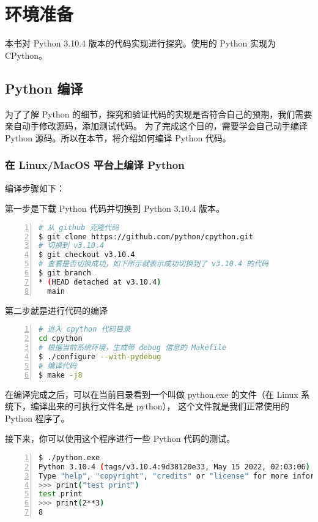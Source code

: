 \chapter{环境准备}

本书对 Python 3.10.4 版本的代码实现进行探究。使用的 Python 实现为 CPython。

\section{Python 编译}

为了了解 Python 的细节，探究和验证代码的实现是否符合自己的预期，我们需要亲自动手修改源码，添加测试代码。
为了完成这个目的，需要学会自己动手编译 Python 源码。所以在本节，将介绍如何编译 Python 代码。

\subsection{在 Linux/MacOS 平台上编译 Python}

编译步骤如下：

第一步是下载 Python 代码并切换到 Python 3.10.4 版本。

\begin{lstlisting}[language=bash, numbers=left, numbersep=1em, numberstyle=\footnotesize , breaklines=true]
# 从 github 克隆代码
$ git clone https://github.com/python/cpython.git
# 切换到 v3.10.4
$ git checkout v3.10.4
# 查看是否切换成功，如下所示就表示成功切换到了 v3.10.4 的代码
$ git branch
* (HEAD detached at v3.10.4)
  main
\end{lstlisting}

第二步就是进行代码的编译

\begin{lstlisting}[language=bash, numbers=left, numbersep=1em, numberstyle=\footnotesize , breaklines=true]
# 进入 cpython 代码目录
cd cpython
# 根据当前系统环境，生成带 debug 信息的 Makefile 
$ ./configure --with-pydebug
# 编译代码
$ make -j8
\end{lstlisting}

在编译完成之后，可以在当前目录看到一个叫做 python.exe 的文件（在 Linux 系统下，编译出来的可执行文件名是 python），
这个文件就是我们正常使用的 Python 程序了。

接下来，你可以使用这个程序进行一些 Python 代码的测试。

\begin{lstlisting}[language=bash, numbers=left, numbersep=1em, numberstyle=\footnotesize , breaklines=true]
$ ./python.exe
Python 3.10.4 (tags/v3.10.4:9d38120e33, May 15 2022, 02:03:06) [Clang 13.0.0 (clang-1300.0.29.30)] on darwin
Type "help", "copyright", "credits" or "license" for more information.
>>> print("test print")
test print
>>> print(2**3)
8
\end{lstlisting}


